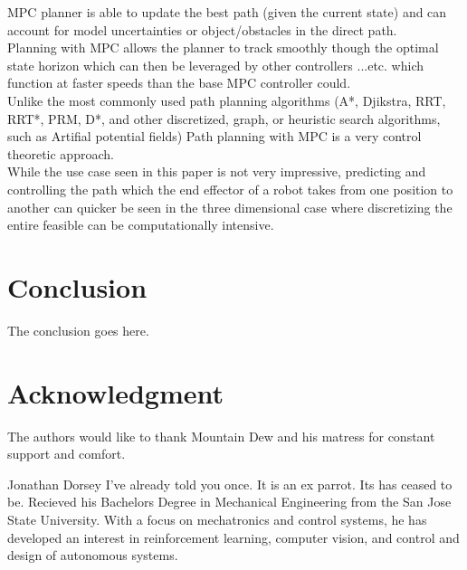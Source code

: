 \documentclass[journal]{IEEEtran}
\begin{document}
MPC planner is able to update the best path (given the current state) and can account for model uncertainties or object/obstacles in the direct path.\\

Planning with MPC allows the planner to track smoothly though the optimal state horizon which can then be leveraged by other controllers ...etc. which function at faster speeds than the base MPC controller could.\\

Unlike the most commonly used path planning algorithms (A*, Djikstra, RRT, RRT*, PRM, D*, and other discretized, graph, or heuristic search algorithms, such as Artifial potential fields) Path planning with MPC is a very control theoretic approach.\\

While the use case seen in this paper is not very impressive, predicting and controlling the path which the end effector of a robot takes from one position to another can quicker be seen in the three dimensional case where discretizing the entire feasible can be computationally intensive.\\





\section{Conclusion}
The conclusion goes here.


\section*{Acknowledgment}


The authors would like to thank Mountain Dew and his matress for constant support and comfort.



\ifCLASSOPTIONcaptionsoff
  \newpage
\fi

\cite{craig_introduction_2005}
\cite{khalil_nonlinear_2002}
\cite{rawlings_model_2017}
\cite{armstrong_explicit_1986}
\cite{ogata_modern_2010}
\cite{meriam_engineering_1993}
\cite{greenwood_advanced_2006}
\cite{borrelli_predictive_2017}
\cite{boyd_convex_2004}
\cite{slotine_applied_1991}
\cite{soft_constraints}


\begin{IEEEbiography}{Jonathan Dorsey}
  I've already told you once. It is an ex parrot. Its has ceased to be. Recieved his Bachelors Degree in Mechanical Engineering from the San Jose State University. With a focus on mechatronics and control systems, he has developed an interest in reinforcement learning, computer vision, and control and design of autonomous systems.
\end{IEEEbiography}
\end{document}
